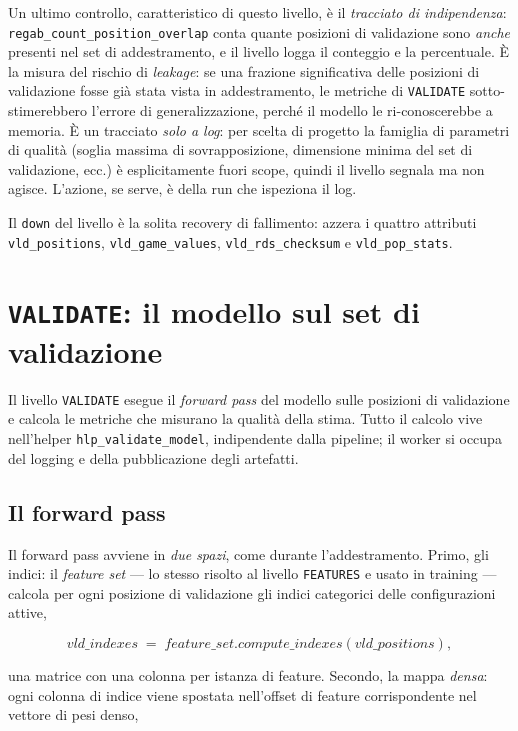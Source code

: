 Un ultimo controllo, caratteristico di questo livello, è il \emph{tracciato
di indipendenza}: \texttt{regab\_count\_position\_overlap} conta quante
posizioni di validazione sono \emph{anche} presenti nel set di addestramento,
e il livello logga il conteggio e la percentuale. È la misura del rischio di
\emph{leakage}: se una frazione significativa delle posizioni di validazione
fosse già stata vista in addestramento, le metriche di \texttt{VALIDATE}
sotto-stimerebbero l'errore di generalizzazione, perché il modello le
ri-conoscerebbe a memoria. È un tracciato \emph{solo a log}: per scelta di
progetto la famiglia di parametri di qualità (soglia massima di sovrapposizione,
dimensione minima del set di validazione, ecc.) è esplicitamente fuori scope,
quindi il livello segnala ma non agisce. L'azione, se serve, è della run che
ispeziona il log.

Il \texttt{down} del livello è la solita recovery di fallimento: azzera i
quattro attributi \texttt{vld\_positions}, \texttt{vld\_game\_values},
\texttt{vld\_rds\_checksum} e \texttt{vld\_pop\_stats}.

\section{\texttt{VALIDATE}: il modello sul set di validazione}

Il livello \texttt{VALIDATE} esegue il \emph{forward pass} del modello sulle
posizioni di validazione e calcola le metriche che misurano la qualità della
stima. Tutto il calcolo vive nell'helper \texttt{hlp\_validate\_model},
indipendente dalla pipeline; il worker si occupa del logging e della
pubblicazione degli artefatti.

\subsection{Il forward pass}

Il forward pass avviene in \emph{due spazi}, come durante l'addestramento.
Primo, gli indici: il \emph{feature set} — lo stesso risolto al livello
\texttt{FEATURES} e usato in training — calcola per ogni posizione di
validazione gli indici categorici delle configurazioni attive,

\begin{equation}
  \mathit{vld\_indexes} \;=\; \mathit{feature\_set.compute\_indexes}
  (\mathit{vld\_positions}),
\end{equation}

una matrice con una colonna per istanza di feature. Secondo, la mappa
\emph{densa}: ogni colonna di indice viene spostata nell'offset di feature
corrispondente nel vettore di pesi denso,

